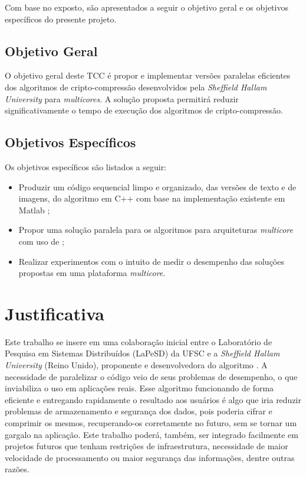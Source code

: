 Com base no exposto, são apresentados a seguir o objetivo geral e os objetivos específicos do presente projeto.

\subsection{Objetivo Geral}

O objetivo geral deste TCC é propor e implementar versões paralelas eficientes dos algoritmos de cripto-compressão \gmpr desenvolvidos pela \textit{Sheffield Hallam University} para \textit{multicores}. A solução proposta permitirá reduzir significativamente o tempo de execução dos algoritmos de cripto-compressão.

\subsection{Objetivos Específicos}

Os objetivos específicos são listados a seguir:

\begin{itemize}
\item Produzir um código sequencial limpo e organizado, das versões de texto e de imagens, do algoritmo \gmpr em C++ com base na implementação existente em Matlab \cite{shu13715};
\item Propor uma solução paralela para os algoritmos para arquiteturas \textit{multicore} com uso de \openMP;
\item Realizar experimentos com o intuito de medir o desempenho das soluções propostas em uma plataforma \textit{multicore}.
\end{itemize}

\section{Justificativa}

Este trabalho se insere em uma colaboração inicial entre o Laboratório de Pesquisa em Sistemas Distribuídos (LaPeSD) da UFSC e a \textit{Sheffield Hallam University} (Reino Unido), proponente e desenvolvedora do algoritmo \gmpr. A necessidade de paralelizar o código veio de seus problemas de desempenho, o que inviabiliza o uso em aplicações reais. Esse algoritmo funcionando de forma eficiente e entregando rapidamente o resultado aos usuários é algo que iria reduzir problemas de armazenamento e segurança dos dados, pois poderia cifrar e comprimir os mesmos, recuperando-os corretamente no futuro, sem se tornar um gargalo na aplicação. Este trabalho poderá, também, ser integrado facilmente em projetos futuros que tenham restrições de infraestrutura, necessidade de maior velocidade de processamento ou maior segurança das informações, dentre outras razões.

